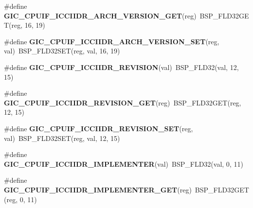 \begin{DoxyCompactItemize}
\item 
\mbox{\label{arm-gic-regs_8h_a5f2033b3b2babaa3bb24f2e9cd64a54a}} 
\#define {\bfseries G\+I\+C\+\_\+\+C\+P\+U\+I\+F\+\_\+\+I\+C\+C\+I\+I\+D\+R\+\_\+\+A\+R\+C\+H\+\_\+\+V\+E\+R\+S\+I\+O\+N\+\_\+\+G\+ET}(reg)~B\+S\+P\+\_\+\+F\+L\+D32\+G\+ET(reg, 16, 19)
\item 
\mbox{\label{arm-gic-regs_8h_a76e22551c7d5bd89182dbd789ee89dff}} 
\#define {\bfseries G\+I\+C\+\_\+\+C\+P\+U\+I\+F\+\_\+\+I\+C\+C\+I\+I\+D\+R\+\_\+\+A\+R\+C\+H\+\_\+\+V\+E\+R\+S\+I\+O\+N\+\_\+\+S\+ET}(reg,  val)~B\+S\+P\+\_\+\+F\+L\+D32\+S\+ET(reg, val, 16, 19)
\item 
\mbox{\label{arm-gic-regs_8h_a62f9945e199a7154f016e4bf0074d7e2}} 
\#define {\bfseries G\+I\+C\+\_\+\+C\+P\+U\+I\+F\+\_\+\+I\+C\+C\+I\+I\+D\+R\+\_\+\+R\+E\+V\+I\+S\+I\+ON}(val)~B\+S\+P\+\_\+\+F\+L\+D32(val, 12, 15)
\item 
\mbox{\label{arm-gic-regs_8h_aba25ef8d2837dd6f2d2aebdb3127e162}} 
\#define {\bfseries G\+I\+C\+\_\+\+C\+P\+U\+I\+F\+\_\+\+I\+C\+C\+I\+I\+D\+R\+\_\+\+R\+E\+V\+I\+S\+I\+O\+N\+\_\+\+G\+ET}(reg)~B\+S\+P\+\_\+\+F\+L\+D32\+G\+ET(reg, 12, 15)
\item 
\mbox{\label{arm-gic-regs_8h_a2d698f0060dd2d29046e330de18c9c0f}} 
\#define {\bfseries G\+I\+C\+\_\+\+C\+P\+U\+I\+F\+\_\+\+I\+C\+C\+I\+I\+D\+R\+\_\+\+R\+E\+V\+I\+S\+I\+O\+N\+\_\+\+S\+ET}(reg,  val)~B\+S\+P\+\_\+\+F\+L\+D32\+S\+ET(reg, val, 12, 15)
\item 
\mbox{\label{arm-gic-regs_8h_a3449a4ac088e68d18c566d086b20412b}} 
\#define {\bfseries G\+I\+C\+\_\+\+C\+P\+U\+I\+F\+\_\+\+I\+C\+C\+I\+I\+D\+R\+\_\+\+I\+M\+P\+L\+E\+M\+E\+N\+T\+ER}(val)~B\+S\+P\+\_\+\+F\+L\+D32(val, 0, 11)
\item 
\mbox{\label{arm-gic-regs_8h_a07f5bddac9da03213e317785d6c4c695}} 
\#define {\bfseries G\+I\+C\+\_\+\+C\+P\+U\+I\+F\+\_\+\+I\+C\+C\+I\+I\+D\+R\+\_\+\+I\+M\+P\+L\+E\+M\+E\+N\+T\+E\+R\+\_\+\+G\+ET}(reg)~B\+S\+P\+\_\+\+F\+L\+D32\+G\+ET(reg, 0, 11)
\item 
\mbox{\label{arm-gic-regs_8h_a47a1846631850b7a7c88fa41b061a869}} 

\end{DoxyCompactItemize}
